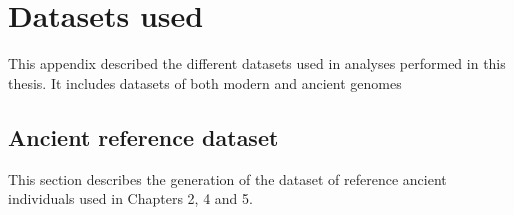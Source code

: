 
\appendix
\chapter{Datasets used}

This appendix described the different datasets used in analyses performed in this thesis. It includes datasets of both modern and ancient genomes 

\section{Ancient reference dataset} \label{section:AncientReferenceDataset}

This section describes the generation of the dataset of reference ancient individuals used in Chapters 2, 4 and 5. 


